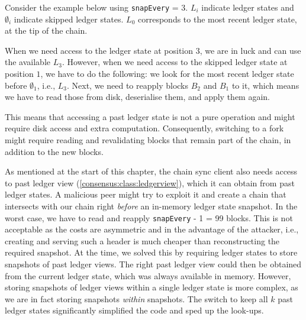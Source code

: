 Consider the example below using \lstinline!snapEvery! = 3. $L_i$ indicate
ledger states and $\emptyset_i$ indicate skipped ledger states. $L_0$ corresponds to the
most recent ledger state, at the tip of the chain.
%
\begin{center}
\end{center}
%
When we need access to the ledger state at position $3$, we are in luck and can
use the available $L_3$. However, when we need access to the skipped ledger
state at position $1$, we have to do the following: we look for the most recent
ledger state before $\emptyset_1$, i.e., $L_3$. Next, we need to reapply blocks $B_2$
and $B_1$ to it, which means we have to read those from disk, deserialise them,
and apply them again.

This means that accessing a past ledger state is not a pure operation and might
require disk access and extra computation. Consequently, switching to a fork
might require reading and revalidating blocks that remain part of the chain, in
addition to the new blocks.

As mentioned at the start of this chapter, the chain sync client also needs
access to past ledger view (\cref{consensus:class:ledgerview}), which it can
obtain from past ledger states. A malicious peer might try to exploit it and
create a chain that intersects with our chain right \emph{before} an in-memory
ledger state snapshot. In the worst case, we have to read and reapply
\lstinline!snapEvery! - 1 = 99 blocks. This is not acceptable as the costs are
asymmetric and in the advantage of the attacker, i.e., creating and serving such
a header is much cheaper than reconstructing the required snapshot. At the time,
we solved this by requiring ledger states to store snapshots of past ledger
views. The right past ledger view could then be obtained from the current ledger
state, which was always available in memory. However, storing snapshots of
ledger views within a single ledger state is more complex, as we are in fact
storing snapshots \emph{within} snapshots. The switch to keep all $k$ past
ledger states significantly simplified the code and sped up the look-ups.

